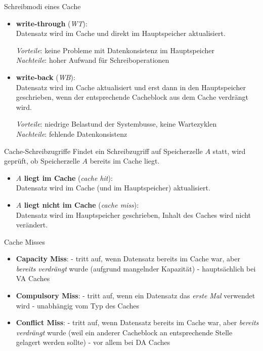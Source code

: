 \documentclass[german]{spicker}
\begin{document}
\begin{defi}{Schreibmodi eines Cache}
    \begin{itemize}
        \item \textbf{write-through} (\emph{WT}):\\
              Datensatz wird im Cache und direkt im Hauptspeicher aktualisiert.

              \emph{Vorteile}: keine Probleme mit Datenkonsistenz im Hauptspeicher\\
              \emph{Nachteile}: hoher Aufwand für Schreiboperationen
        \item \textbf{write-back} (\emph{WB}):\\
              Datensatz wird im Cache aktualisiert und erst dann in den Hauptspeicher geschrieben, wenn der entsprechende Cacheblock aus dem Cache verdrängt wird.

              \emph{Vorteile}: niedrige Belastund der Systembusse, keine Wartezyklen\\
              \emph{Nachteile}: fehlende Datenkonsistenz
    \end{itemize}
\end{defi}

\begin{defi}{Cache-Schreibzugriffe}
    Findet ein Schreibzugriff auf Speicherzelle $A$ statt, wird geprüft, ob Speicherzelle $A$ bereits im Cache liegt.
    \begin{itemize}
        \item \textbf{$A$ liegt im Cache} (\emph{cache hit}):\\
              Datensatz wird im Cache (und im Hauptspeicher) aktualisiert.
        \item \textbf{$A$ liegt nicht im Cache} (\emph{cache miss}):\\
              Datensatz wird im Hauptspeicher geschrieben, Inhalt des Caches wird nicht verändert.
    \end{itemize}
\end{defi}

\begin{defi}{Cache Misses}
    \begin{itemize}
        \item \textbf{Capacity Miss}:
              \subitem - tritt auf, wenn Datensatz bereits im Cache war, aber \emph{bereits verdrängt} wurde
              \subitem (aufgrund mangelnder Kapazität)
              \subitem - hauptsächlich bei VA Caches
        \item \textbf{Compulsory Miss}:
              \subitem - tritt auf, wenn ein Datensatz das \emph{erste Mal} verwendet wird
              \subitem - unabhängig vom Typ des Caches
        \item \textbf{Conflict Miss}:
              \subitem - tritt auf, wenn Datensatz bereits im Cache war, aber \emph{bereits verdrängt} wurde
              \subitem (weil ein anderer Cacheblock an entsprechende Stelle gelagert werden sollte)
              \subitem - vor allem bei DA Caches
    \end{itemize}
\end{defi}
\end{document}
